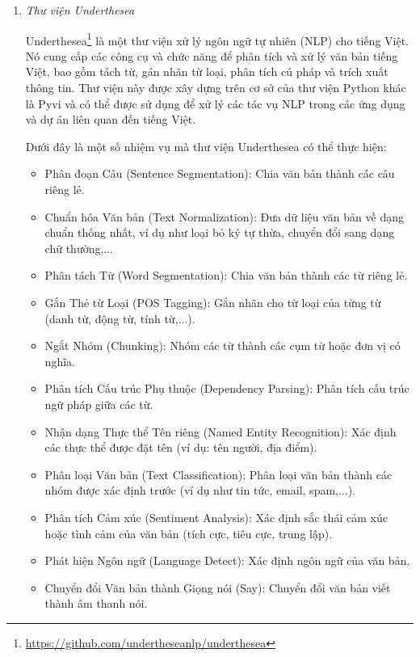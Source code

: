 \begin{enumerate}
    \item \textit{Thư viện Underthesea}

          Underthesea\footnote{\url{https://github.com/undertheseanlp/underthesea}} là một thư viện xử lý ngôn ngữ tự nhiên (NLP) cho tiếng Việt. Nó cung cấp các công cụ và chức năng để phân tích và xử lý văn bản tiếng Việt, bao gồm tách từ, gán nhãn từ loại, phân tích cú pháp và trích xuất thông tin. Thư viện này được xây dựng trên cơ sở của thư viện Python khác là Pyvi và có thể được sử dụng để xử lý các tác vụ NLP trong các ứng dụng và dự án liên quan đến tiếng Việt.

          Dưới đây là một số nhiệm vụ mà thư viện Underthesea có thể thực hiện:
          \begin{itemize}
              \item Phân đoạn Câu (Sentence Segmentation): Chia văn bản thành các câu riêng lẻ.
              \item Chuẩn hóa Văn bản (Text Normalization): Đưa dữ liệu văn bản về dạng chuẩn thống nhất, ví dụ như loại bỏ ký tự thừa, chuyển đổi sang dạng chữ thường,...
              \item Phân tách Từ (Word Segmentation): Chia văn bản thành các từ riêng lẻ.
              \item Gắn Thẻ từ Loại (POS Tagging): Gắn nhãn cho từ loại của từng từ (danh từ, động từ, tính từ,...).
              \item Ngắt Nhóm (Chunking): Nhóm các từ thành các cụm từ hoặc đơn vị có nghĩa.
              \item Phân tích Cấu trúc Phụ thuộc (Dependency Parsing): Phân tích cấu trúc ngữ pháp giữa các từ.
              \item Nhận dạng Thực thể Tên riêng (Named Entity Recognition): Xác định các thực thể được đặt tên (ví dụ: tên người, địa điểm).
              \item Phân loại Văn bản (Text Classification): Phân loại văn bản thành các nhóm được xác định trước (ví dụ như tin tức, email, spam,...).
              \item Phân tích Cảm xúc (Sentiment Analysis): Xác định sắc thái cảm xúc hoặc tình cảm của văn bản (tích cực, tiêu cực, trung lập).
              \item Phát hiện Ngôn ngữ (Language Detect): Xác định ngôn ngữ của văn bản.
              \item Chuyển đổi Văn bản thành Giọng nói (Say): Chuyển đổi văn bản viết thành âm thanh nói.
          \end{itemize}



\end{enumerate}
